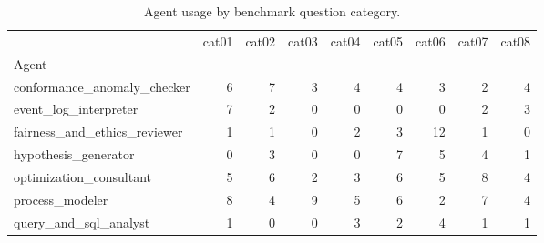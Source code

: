 \begin{table}
\caption{Agent usage by benchmark question category.}
\label{tab:agent-usage-by-category}
\begin{tabular}{lrrrrrrrr}
\toprule
 & cat01 & cat02 & cat03 & cat04 & cat05 & cat06 & cat07 & cat08 \\
Agent &  &  &  &  &  &  &  &  \\
\midrule
conformance\_anomaly\_checker & 6 & 7 & 3 & 4 & 4 & 3 & 2 & 4 \\
event\_log\_interpreter & 7 & 2 & 0 & 0 & 0 & 0 & 2 & 3 \\
fairness\_and\_ethics\_reviewer & 1 & 1 & 0 & 2 & 3 & 12 & 1 & 0 \\
hypothesis\_generator & 0 & 3 & 0 & 0 & 7 & 5 & 4 & 1 \\
optimization\_consultant & 5 & 6 & 2 & 3 & 6 & 5 & 8 & 4 \\
process\_modeler & 8 & 4 & 9 & 5 & 6 & 2 & 7 & 4 \\
query\_and\_sql\_analyst & 1 & 0 & 0 & 3 & 2 & 4 & 1 & 1 \\
\bottomrule
\end{tabular}
\end{table}

